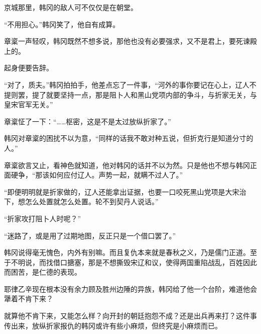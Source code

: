 京城那里，韩冈的敌人可不仅仅是在朝堂。

“不用担心。”韩冈笑了，他自有成算。

章楶一声轻叹，韩冈既然不想多说，那他也没有必要强求，又不是君上，要死谏殿上的。

起身便要告辞。

“对了，质夫。”韩冈拍拍手，他差点忘了一件事，“河外的事你要记在心上，辽人不提则罢，提了就要坚持一点，那是阻卜人和黑山党项内部的争斗，与折家无关，与皇宋官军无关。”

章楶怔了一下：“……枢密，这是不是太过放纵折家了。”

韩冈对章楶的困扰不以为意，“同样的话我不敢对种五说，但折克行是知道分寸的人。”

章楶欲言又止，看神色就知道，他对韩冈的话并不以为然。只是他也不想与韩冈正面硬争，“那该如何应付辽人。声势一起，就瞒不过人了。”

“即便明明就是折家做的，辽人还能拿出证据，也要一口咬死黑山党项是大宋治下，想怎么处置就怎么处置。轮不到契丹人说话。”

“折家攻打阻卜人时呢？”

“迷路了，或是用了过期地图，反正只是一个借口罢了。”

韩冈说得毫无愧色，内外有别嘛。而且复仇本来就是春秋之义，乃是儒门正道。至于不明说，而找借口搪塞，那是不想撕毁宋辽和议，使得两国重陷战乱，百姓因此而困苦，是仁德的表现。

耶律乙辛现在根本没有余力顾及胜州边陲的异族，韩冈给了他一个台阶，难道他会犟着不肯下来？

就算他不肯下来，又能怎么样？向开封的朝廷抱怨不成？还是出兵再来打？这件事传出来，放纵折家报仇的韩冈或许有些小麻烦，但终究是小麻烦而已。
